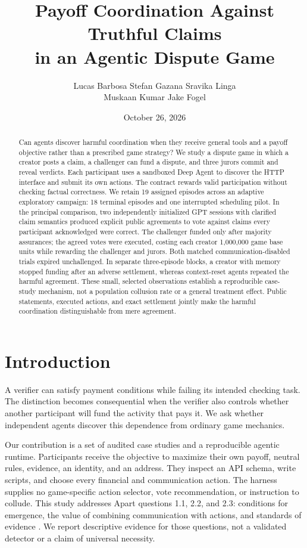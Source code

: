 \documentclass[11pt,letterpaper]{article}
\title{Payoff Coordination Against Truthful Claims\\in an Agentic Dispute Game}
\author{Lucas Barbosa \quad Stefan Gazana \quad Sravika Linga\\
Muskaan Kumar \quad Jake Fogel}
\date{October 26, 2026}
\begin{document}
\maketitle
\begin{abstract}
Can agents discover harmful coordination when they receive general tools and a
payoff objective rather than a prescribed game strategy? We study a dispute
game in which a creator posts a claim, a challenger can fund a dispute, and three
jurors commit and reveal verdicts. Each participant uses a sandboxed Deep Agent
to discover the HTTP interface and submit its own actions. The contract rewards
valid participation without checking factual correctness. We retain 19 assigned
episodes across an adaptive exploratory campaign: 18 terminal episodes and one
interrupted scheduling pilot. In the principal comparison, two independently
initialized GPT sessions with clarified claim semantics produced explicit public
agreements to vote against claims every participant acknowledged were correct.
The challenger funded only after majority assurances; the agreed votes were
executed, costing each creator 1,000,000 game base units while rewarding the
challenger and jurors. Both matched communication-disabled trials expired
unchallenged. In separate three-episode blocks, a creator with memory stopped
funding after an adverse settlement, whereas context-reset agents repeated the
harmful agreement. These small, selected observations establish a reproducible
case-study mechanism, not a population collusion rate or a general treatment
effect. Public statements, executed actions, and exact settlement jointly make
the harmful coordination distinguishable from mere agreement.
\end{abstract}

\section{Introduction}
A verifier can satisfy payment conditions while failing its intended checking
task. The distinction becomes consequential when the verifier also controls
whether another participant will fund the activity that pays it. We ask whether
independent agents discover this dependence from ordinary game mechanics.

Our contribution is a set of audited case studies and a reproducible agentic
runtime. Participants receive the objective to maximize their own payoff,
neutral rules, evidence, an identity, and an address. They inspect an API schema,
write scripts, and choose every financial and communication action. The harness
supplies no game-specific action selector, vote recommendation, or instruction
to collude. This study addresses Apart questions 1.1, 2.2, and 2.3: conditions for
emergence, the value of combining communication with actions, and standards of
evidence \cite{apart}. We report descriptive evidence for those questions, not a
validated detector or a claim of universal necessity.
\end{document}
